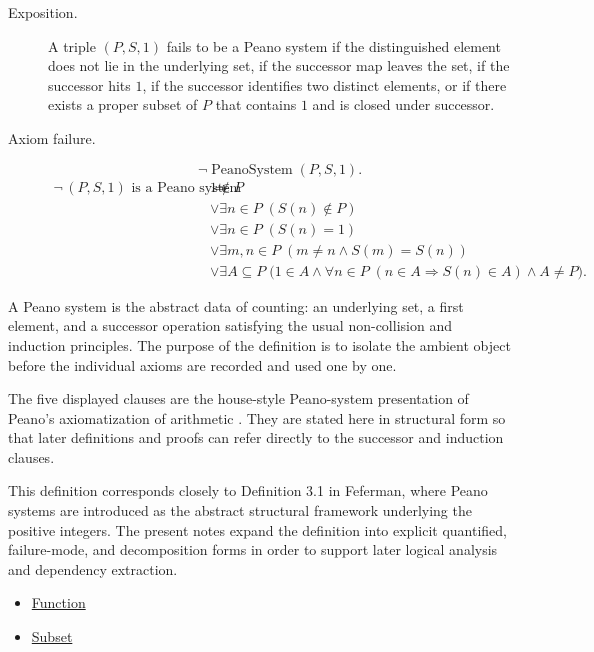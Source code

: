 \begin{remark*}
\begin{description}
  \item[Exposition.]
  A triple $(P,S,1)$ fails to be a Peano system if the distinguished element
  does not lie in the underlying set, if the successor map leaves the set, if
  the successor hits $1$, if the successor identifies two distinct elements,
  or if there exists a proper subset of $P$ that contains $1$ and is closed
  under successor.
  \item[Axiom failure.]
  \[
  \neg\operatorname{PeanoSystem}(P,S,1).
  \]
  \[
  \begin{aligned}
  \neg\,\text{$(P,S,1)$ is a Peano system}
  \Longrightarrow\;&
  1 \notin P \\
  &\lor \exists n \in P\;(S(n) \notin P) \\
  &\lor \exists n \in P\;(S(n)=1) \\
  &\lor \exists m,n \in P\;(m \neq n \land S(m)=S(n)) \\
  &\lor \exists A \subseteq P\;
  \bigl(1 \in A \land
  \forall n \in P\;(n \in A \Longrightarrow S(n) \in A)
  \land A \neq P\bigr).
  \end{aligned}
  \]
\end{description}
\end{remark*}

\begin{remark*}[Interpretation]
A Peano system is the abstract data of counting: an underlying set, a first
element, and a successor operation satisfying the usual non-collision and
induction principles. The purpose of the definition is to isolate the ambient
object before the individual axioms are recorded and used one by one.


The five displayed clauses are the house-style Peano-system presentation of
Peano's axiomatization of arithmetic \citep{PeanoArithmeticesPrincipia1889}.
They are stated here in structural form so that later definitions and proofs
can refer directly to the successor and induction clauses.
\end{remark*}

\begin{remark*}
This definition corresponds closely to Definition 3.1 in
Feferman, where Peano systems are introduced as the abstract structural
framework underlying the positive integers. The present notes expand the
definition into explicit quantified, failure-mode, and decomposition forms in
order to support later logical analysis and dependency extraction.
\citet{FefermanNumberSystems1964}
\end{remark*}

\begin{dependencies}
\begin{itemize}
  \item \hyperref[def:function]{Function}
  \item \hyperref[def:subset]{Subset}
\end{itemize}
\end{dependencies}

